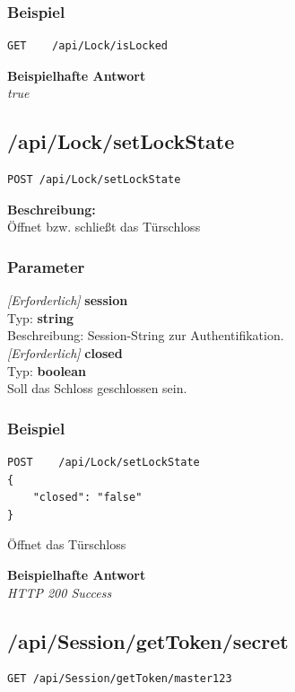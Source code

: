 \subsubsection{Beispiel}
\begin{lstlisting}
GET    /api/Lock/isLocked

\end{lstlisting}
\textbf{Beispielhafte Antwort} \\
\textit{true}





\subsection{/api/Lock/setLockState}
\begin{lstlisting}
POST /api/Lock/setLockState
\end{lstlisting}

\textbf{Beschreibung:} \\
Öffnet bzw. schließt das Türschloss 

\subsubsection{Parameter}
\textit{[Erforderlich]} \textbf{session} \\
Typ: \textbf{string} \\
Beschreibung: Session-String zur Authentifikation.\\

\textit{[Erforderlich]} \textbf{closed} \\
Typ: \textbf{boolean} \\
Soll das Schloss geschlossen sein.

\subsubsection{Beispiel}
\begin{lstlisting}
POST    /api/Lock/setLockState
{
    "closed": "false"
}
\end{lstlisting}
Öffnet das Türschloss

\textbf{Beispielhafte Antwort} \\
\textit{HTTP 200 Success}





\subsection{/api/Session/getToken/{secret}}
\begin{lstlisting}
GET /api/Session/getToken/master123
\end{lstlisting}

